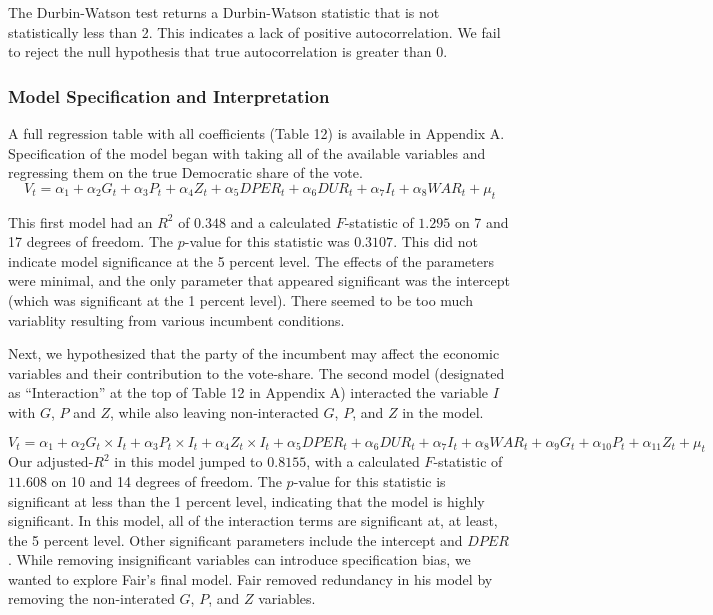 \documentclass[11,]{article}
\begin{document}
The Durbin-Watson test returns a Durbin-Watson statistic that is not
statistically less than 2. This indicates a lack of positive
autocorrelation. We fail to reject the null hypothesis that true
autocorrelation is greater than 0.

\hypertarget{model-specification-and-interpretation}{%
\subsubsection{Model Specification and
Interpretation}\label{model-specification-and-interpretation}}

A full regression table with all coefficients (Table 12) is available in
Appendix A. Specification of the model began with taking all of the
available variables and regressing them on the true Democratic share of
the vote.
\[V_t = \alpha_1 + \alpha_2 G_t + \alpha_3 P_t + \alpha_4 Z_t+ \alpha_5 {DPER_t} + \alpha_6 {DUR_t} +\alpha_7 I_t + \alpha_8 {WAR_t} + \mu_t\]

This first model had an \(R^2\) of \(0.348\) and a calculated
\(F\)-statistic of \(1.295\) on 7 and 17 degrees of freedom. The
\(p\)-value for this statistic was \(0.3107\). This did not indicate
model significance at the 5 percent level. The effects of the parameters
were minimal, and the only parameter that appeared significant was the
intercept (which was significant at the 1 percent level). There seemed
to be too much variablity resulting from various incumbent conditions.

Next, we hypothesized that the party of the incumbent may affect the
economic variables and their contribution to the vote-share. The second
model (designated as ``Interaction'' at the top of Table 12 in Appendix
A) interacted the variable \(I\) with \(G\), \(P\) and \(Z\), while also
leaving non-interacted \(G\), \(P\), and \(Z\) in the model.

\[V_t = \alpha_1 + \alpha_2 G_t\times I_t + \alpha_3 P_t\times I_t + \alpha_4 Z_t\times I_t + \alpha_5 {DPER_t} + \alpha_6 {DUR_t} +\alpha_7 I_t + \alpha_8 {WAR_t} + \alpha_9 G_t + \alpha_{10} P_t + \alpha_{11} Z_t + \mu_t\]
Our adjusted-\(R^2\) in this model jumped to \(0.8155\), with a
calculated \(F\)-statistic of \(11.608\) on 10 and 14 degrees of
freedom. The \(p\)-value for this statistic is significant at less than
the 1 percent level, indicating that the model is highly significant. In
this model, all of the interaction terms are significant at, at least,
the 5 percent level. Other significant parameters include the intercept
and \(DPER\). While removing insignificant variables can introduce
specification bias, we wanted to explore Fair's final model. Fair
removed redundancy in his model by removing the non-interated \(G\),
\(P\), and \(Z\) variables.
\end{document}
